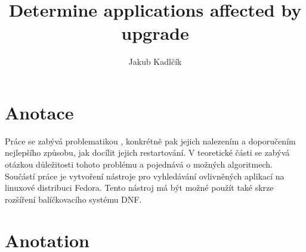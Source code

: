 \documentclass[10pt,a4paper]{article}
\title{Determine applications affected by upgrade}
\author{Jakub Kadlčík}
\begin{document}
	\maketitle
	\newpage

	\section{Anotace} %
	Práce se zabývá problematikou , konkrétně pak jejich nalezením a doporučením nejlepšího způsobu, jak docílit jejich restartování. V teoretické části se zabývá otázkou důležitosti tohoto problému a pojednává o možných algoritmech. Součástí práce je vytvoření nástroje pro vyhledávání ovlivněných aplikací na linuxové distribuci Fedora. Tento nástroj má být možné použít také skrze rozšíření balíčkovacího systému DNF.

	\section{Anotation}


	\newpage
	\tableofcontents
	\newpage
\end{document}
